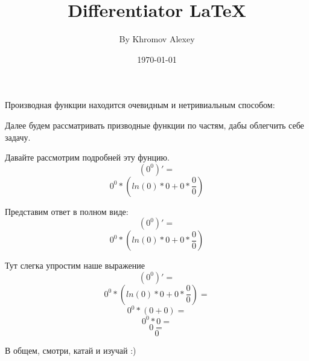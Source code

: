 \documentclass[a4paper,12pt]{article}
\author{By Khromov Alexey}
\title{Differentiator \LaTeX{}}
\date{\today}
\begin{document}
\maketitle
\newpage
Производная функции находится очевидным и нетривиальным способом:

Далее будем рассматривать призводные функции по частям, дабы облегчить себе задачу.

Давайте рассмотрим подробней эту фунцию.
\begin{equation}
\left( {0 }^ {0 }\right)' =
\end{equation}
\begin{equation}
{{0 }^ {0 }}* {\left( {{ln \left( {0 }\right) }* {0 }}+ {{0 }* {\frac{{0 }}{{0 }}}}\right) }
\end{equation}

Представим ответ в полном виде:
\begin{equation}
\left( {0 }^ {0 }\right)' =
\end{equation}
\begin{equation}
{{0 }^ {0 }}* {\left( {{ln \left( {0 }\right) }* {0 }}+ {{0 }* {\frac{{0 }}{{0 }}}}\right) }
\end{equation}

Тут слегка упростим наше выражение
\begin{equation}
\left( {0 }^ {0 }\right)' =
\end{equation}
\begin{equation}
{{0 }^ {0 }}* {\left( {{ln \left( {0 }\right) }* {0 }}+ {{0 }* {\frac{{0 }}{{0 }}}}\right) }=
\end{equation}
\begin{equation}
{{0 }^ {0 }}* {\left( {0 }+ {0 }\right) }=
\end{equation}
\begin{equation}
{{0 }^ {0 }}* {0 }=
\end{equation}
\begin{equation}
0 =
\end{equation}
\begin{equation}
0 
\end{equation}

В общем, смотри, катай и изучай :)
\end{document}
